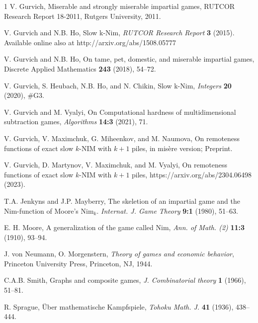 \documentclass[10pt]{article}
\theoremstyle{definition}
\begin{document}
\begin{thebibliography}{1}
 V. Gurvich, 
Miserable and strongly miserable impartial games, 
RUTCOR Research Report 18-2011, Rutgers University, 2011.

V. Gurvich and N.B. Ho, Slow k-Nim, 
{\it RUTCOR Research Report} {\bf3} (2015). 
Available online also at
http://arxiv.org/abs/1508.05777

V. Gurvich and N.B. Ho,
On tame, pet, domestic, and miserable impartial games,
Discrete Applied Mathematics {\bf 243} (2018), 54--72.

V. Gurvich, S. Heubach, N.B. Ho, and N. Chikin, 
Slow k-Nim, {\it Integers} {\bf20} (2020),  \#G3.

V. Gurvich and M. Vyalyi,  On Computational hardness of
multidimensional subtraction games, 
{\it Algorithms} {\bf 14:3} (2021), 71.

V. Gurvich, V. Maximchuk, G. Miheenkov, 
and M.  Naumova, On remoteness functions of exact slow $k$-NIM with $k+1$ piles, in mis\`ere version; Preprint.

V. Gurvich, D. Martynov, V. Maximchuk, and M. Vyalyi,  
On remoteness functions of exact slow $k$-NIM with $k+1$ piles,  
https://arxiv.org/abs/2304.06498 (2023).  

T.A. Jenkyns and J.P. Mayberry,
The skeletion of an impartial game
and the Nim-function of Moore's Nim$_k$.
{\it Internat. J.  Game Theory} {\bf9:1} (1980), 51--63.

E. H. Moore, A generalization of the game called Nim, 
{\it Ann. of Math. (2)} {\bf11:3} (1910), 93--94.

J. von Neumann, O. Morgenstern, 
{\it Theory of games and economic behavior}, 
Princeton University Press, Princeton, NJ, 1944.

C.A.B. Smith, Graphs and composite games,
{\it J. Combinatorial theory} {\bf1}  (1966), 51--81.

R. Sprague, \"{U}ber mathematische Kampfspiele, 
{\it Tohoku Math. J.} {\bf41} (1936), 438--444.

\end{thebibliography}
\end{document}
